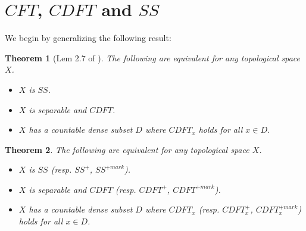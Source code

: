 \documentclass{amsart}
\theoremstyle{plain}
\newtheorem{theorem}{Theorem}
\theoremstyle{definition}
\theoremstyle{remark}
\theoremstyle{plain}
\theoremstyle{definition}
\theoremstyle{remark}
\begin{document}
\section{\(CFT\), \(CDFT\) and \(SS\)}

We begin by generalizing the following result:

\begin{theorem}[Lem 2.7 of \cite{MR2678950}]
  The following are equivalent for any topological space \(X\).
  \begin{itemize}
    \item \(X\) is \(SS\).
    \item \(X\) is separable and \(CDFT\).
    \item \(X\) has a countable dense subset \(D\) where
          \(CDFT_x\) holds for all \(x\in D\).
  \end{itemize}
\end{theorem}

\begin{theorem}
  The following are equivalent for any topological space \(X\).
  \begin{itemize}
    \item \(X\) is \(SS\) (resp. \(SS^+\), \(SS^{+mark}\)).
    \item \(X\) is separable and \(CDFT\)
          (resp. \(CDFT^+\), \(CDFT^{+mark}\)).
    \item \(X\) has a countable dense subset \(D\) where
          \(CDFT_x\) (resp. \(CDFT_x^+\), \(CDFT_x^{+mark}\))
          holds for all \(x\in D\).
  \end{itemize}
\end{theorem}
\end{document}
